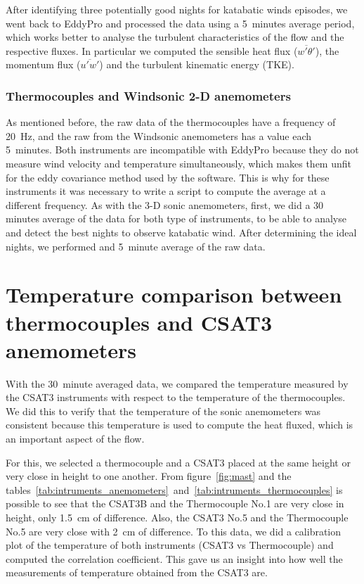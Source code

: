 After identifying three potentially good nights for katabatic winds episodes, we went back to EddyPro and processed the data using a 5~minutes average period, which works better to analyse the turbulent characteristics of the flow and the respective fluxes. In particular we computed the sensible heat flux ($\overline{w'\theta'}$), the momentum flux ($\overline{u'w'}$) and the turbulent kinematic energy (TKE).

\subsubsection{Thermocouples and Windsonic 2-D anemometers}

As mentioned before, the raw data of the thermocouples have a frequency of 20~Hz, and the raw from the Windsonic anemometers has a value each 5~minutes. Both instruments are incompatible with EddyPro because they do not measure wind velocity and temperature simultaneously, which makes them unfit for the eddy covariance method used by the software. This is why for these instruments it was necessary to write a script to compute the average at a different frequency. As with the 3-D sonic anemometers, first, we did a 30 minutes average of the data for both type of instruments, to be able to analyse and detect the best nights to observe katabatic wind. After determining the ideal nights, we performed and 5~minute average of the raw data.

\section{Temperature comparison between thermocouples and CSAT3 anemometers}

With the 30~minute averaged data, we compared the temperature measured by the CSAT3 instruments with respect to the temperature of the thermocouples. We did this to verify that the temperature of the sonic anemometers was consistent because this temperature is used to compute the heat fluxed, which is an important aspect of the flow. 

For this, we selected a thermocouple and a CSAT3 placed at the same height or very close in height to one another. From figure~\ref{fig:mast} and the tables~\ref{tab:intruments_anemometers}~and~\ref{tab:intruments_thermocouples} is possible to see that the CSAT3B and the Thermocouple No.1 are very close in height, only 1.5~cm of difference. Also, the CSAT3 No.5 and the Thermocouple No.5 are very close with 2~cm of difference. To this data, we did a calibration plot of the temperature of both instruments (CSAT3 vs Thermocouple) and computed the correlation coefficient. This gave us an insight into how well the measurements of temperature obtained from the CSAT3 are. 

